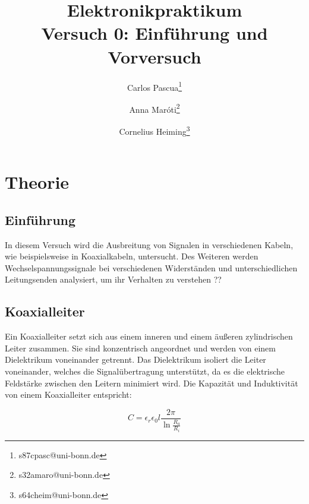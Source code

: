\documentclass{article}
\begin{document}
\begin{titlepage}
    \title{Elektronikpraktikum \\ Versuch 0: Einführung und Vorversuch}
    \author[1]{Carlos Pascua\thanks{s87cpasc@uni-bonn.de}}
    \author[1]{Anna Maróti\thanks{s32amaro@uni-bonn.de}}
    \author[1]{Cornelius Heiming\thanks{s64cheim@uni-bonn.de}}
\end{titlepage}
\maketitle
\tableofcontents
\newpage
{}

\pagestyle{fancy}
\fancyhead[R]{\thepage}
\fancyhead[L]{\leftmark}

\section{Theorie}

\subsection*{Einführung}

In diesem Versuch wird die Ausbreitung von Signalen in verschiedenen Kabeln, wie beispielsweise in Koaxialkabeln, untersucht. Des Weiteren werden Wechselspannungssignale bei verschiedenen Widerständen und unterschiedlichen Leitungsenden analysiert, um ihr Verhalten zu verstehen
??


\subsection*{Koaxialleiter}

Ein Koaxialleiter setzt sich aus einem inneren und einem äußeren zylindrischen Leiter zusammen. Sie sind konzentrisch angeordnet und werden von einem Dielektrikum voneinander getrennt. Das Dielektrikum isoliert die Leiter voneinander, welches die Signalübertragung unterstützt, da es die elektrische Feldstärke zwischen den Leitern minimiert wird. 
Die Kapazität und Induktivität von einem Koaxialleiter entspricht:

    \begin{equation}
        C= \epsilon_r \epsilon_0 l \frac{2\pi}{\ln{\frac{R_a}{R_i}}}
    \end{equation}
    
\end{document}
